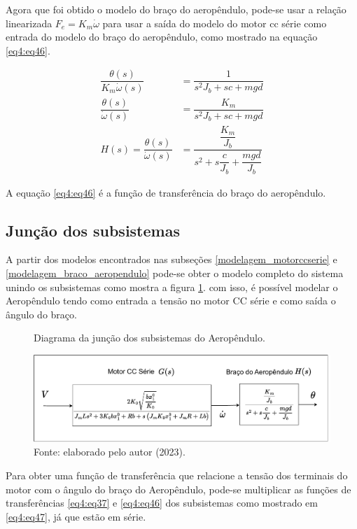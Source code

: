 Agora que foi obtido o modelo do braço do aeropêndulo, pode-se usar a relação linearizada $F_e = K_m\dot{\omega}$ para usar a saída do modelo do motor cc série como entrada do modelo do braço do aeropêndulo, como mostrado na equação \ref{eq4:eq46}.

\begin{align}
    \dfrac{\theta(s)}{K_m\dot{\omega}(s)} &= \dfrac{1}{s^2J_b + sc +mgd} \label{eq4:eq44}\\
    \dfrac{\theta(s)}{\dot{\omega}(s)} &= \dfrac{K_m}{s^2J_b + sc +mgd} \label{eq4:eq45}\\
    H(s) = \dfrac{\theta(s)}{\dot{\omega}(s)} &= \dfrac{\dfrac{K_m}{J_b}}{s^2 + s\dfrac{c}{J_b} +\dfrac{mgd}{J_b}} \label{eq4:eq46}
\end{align}


A equação  \ref{eq4:eq46} é a função de transferência do braço do aeropêndulo.

\subsection{Junção dos subsistemas}
\label{junca0_submodelos}

A partir dos modelos encontrados nas subseções \ref{modelagem_motorccserie} e \ref{modelagem_braco_aeropendulo} pode-se obter o modelo completo do sistema unindo os subsistemas como mostra a figura \ref{fig4:image_05}. com isso, é possível modelar o Aeropêndulo tendo como entrada a tensão no motor CC série e como saída o ângulo do braço.

\begin{figure}[!h]
	\centering
	\caption{Diagrama da junção dos subsistemas do  Aeropêndulo.}
            \includegraphics[width=1\textwidth, page=1]{Capitulos/4_desenvolvimento/4_figuras/ft_subsistemas.pdf}
	\caption*{Fonte: elaborado pelo autor (2023).}
        \label{fig4:image_05}
\end{figure}


Para obter uma função de transferência que relacione a tensão dos terminais do motor com o ângulo do braço do Aeropêndulo, pode-se multiplicar as funções de transferências \ref{eq4:eq37} e \ref{eq4:eq46} dos subsistemas como mostrado em \ref{eq4:eq47}, já que estão em série.

